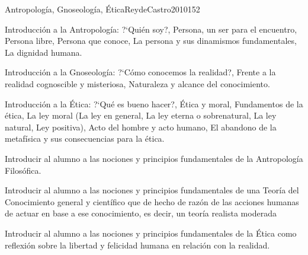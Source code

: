 \begin{syllabus}
\begin{unit}{Antropología, Gnoseología, Ética}{ReydeCastro2010}{15}{2}
\begin{topics}
	\item Introducción a la Antropología: ?`Quién soy?, Persona, un ser para el encuentro, Persona libre, Persona que conoce, La persona y sus dinamismos fundamentales, La dignidad humana.
	\item Introducción a la Gnoseología: ?`Cómo conocemos la realidad?, Frente a la realidad cognoscible y misteriosa, Naturaleza y alcance del conocimiento.
	\item Introducción a la Ética: ?`Qué es bueno hacer?, Ética y moral, Fundamentos de la ética, La ley moral (La ley en general, La ley eterna o sobrenatural, La ley natural, Ley positiva), Acto del hombre y acto humano, El abandono de la metafísica y sus consecuencias para la ética.
\end{topics}

\begin{unitgoals}
	\item Introducir al alumno a las nociones y principios fundamentales de la Antropología Filosófica.
	\item Introducir al alumno a las nociones y principios fundamentales de una Teoría del Conocimiento general y científico que de hecho de razón de las acciones humanas de actuar en base a ese conocimiento, es decir, un teoría realista moderada
	\item Introducir al alumno a las nociones y principios fundamentales de la Ética como reflexión sobre la libertad y felicidad humana en relación con la realidad.
\end{unitgoals}
\end{unit}


\end{syllabus}
